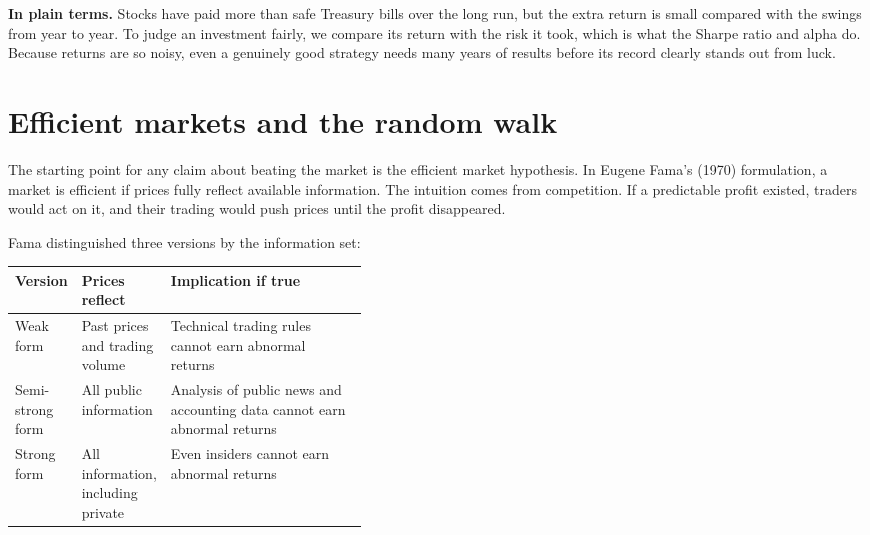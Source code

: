 \noindent\textbf{In plain terms.} Stocks have paid more than safe Treasury bills over the long run, but the extra return is small compared with the swings from year to year. To judge an investment fairly, we compare its return with the risk it took, which is what the Sharpe ratio and alpha do. Because returns are so noisy, even a genuinely good strategy needs many years of results before its record clearly stands out from luck.




\section{Efficient markets and the random walk}
\label{sec:01-efficient-markets}

The starting point for any claim about beating the market is the efficient market hypothesis. In Eugene Fama's (1970) formulation, a market is efficient if prices fully reflect available information. The intuition comes from competition. If a predictable profit existed, traders would act on it, and their trading would push prices until the profit disappeared.

Fama distinguished three versions by the information set:

\begin{center}
\small
\begin{tabularx}{0.9\linewidth}{@{}>{\raggedright\arraybackslash}p{0.180\linewidth}>{\raggedright\arraybackslash}p{0.234\linewidth}>{\raggedright\arraybackslash}X@{}}
\toprule
Version & Prices reflect & Implication if true \\
\midrule
Weak form & Past prices and trading volume & Technical trading rules cannot earn abnormal returns \\
Semi-strong form & All public information & Analysis of public news and accounting data cannot earn abnormal returns \\
Strong form & All information, including private & Even insiders cannot earn abnormal returns \\
\bottomrule
\end{tabularx}
\end{center}

